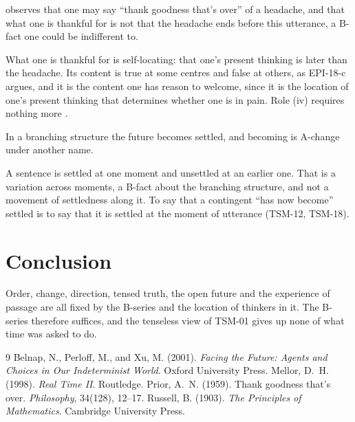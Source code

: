 \documentclass{situationist-preprint}
\begin{document}
\begin{objection}[Relief]
\citet{Prior1959} observes that one may say \enquote{thank goodness that's over} of a headache, and that what one is thankful for is not that the headache ends before this utterance, a B-fact one could be indifferent to.
\end{objection}

\begin{reply}
What one is thankful for is self-locating: that one's present thinking is later than the headache. Its content is true at some centres and false at others, as EPI-18-c argues, and it is the content one has reason to welcome, since it is the location of one's present thinking that determines whether one is in pain. Role (iv) requires nothing more \citep{Mellor1998}.
\end{reply}

\begin{objection}[Becoming]
In a branching structure the future becomes settled, and becoming is A-change under another name.
\end{objection}

\begin{reply}
A sentence is settled at one moment and unsettled at an earlier one. That is a variation across moments, a B-fact about the branching structure, and not a movement of settledness along it. To say that a contingent \enquote{has now become} settled is to say that it is settled at the moment of utterance (TSM-12, TSM-18).
\end{reply}

\section{Conclusion}

Order, change, direction, tensed truth, the open future and the experience of passage are all fixed by the B-series and the location of thinkers in it. The B-series therefore suffices, and the tenseless view of TSM-01 gives up none of what time was asked to do.

\begin{thebibliography}{9}
 Belnap, N., Perloff, M., and Xu, M. (2001). \emph{Facing the Future: Agents and Choices in Our Indeterminist World}. Oxford University Press.
 Mellor, D.~H. (1998). \emph{Real Time II}. Routledge.
 Prior, A.~N. (1959). Thank goodness that's over. \emph{Philosophy}, 34(128), 12--17.
 Russell, B. (1903). \emph{The Principles of Mathematics}. Cambridge University Press.
\end{thebibliography}
\end{document}
